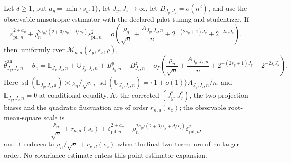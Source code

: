Let \(d\ge1\), put \(a_y=\min\{s_y,1\}\), let \(J_y,J_z\to\infty\), let \(D_{J_y,J_z}=o(n^2)\), and use the observable anisotropic estimator with the declared pilot tuning and studentizer. If
\[
\varepsilon_{\mathrm{pil},n}^{2+a_y}+\rho_n^{2a_y/(2+3/s_y+d/s_z)}\varepsilon_{\mathrm{pil},n}^2
=o\!\left(\frac{\rho_n}{\sqrt n}+\frac{A_{J_y,J_z,n}}n+2^{-(2s_y+1)J_y}+2^{-2s_zJ_z}\right),
\]
then, uniformly over \(\mathcal M_{n,d}(s_y,s_z,\rho)\),
\[
\widehat\theta^{\mathrm{an}}_{J_y,J_z,n}-\theta_n=\mathbb L_{J_y,J_z,n}+\mathbb U_{J_y,J_z,n}+B^y_{J_y,n}+B^z_{J_z,n}+o_P\!\left(\frac{\rho_n}{\sqrt n}+\frac{A_{J_y,J_z,n}}n+2^{-(2s_y+1)J_y}+2^{-2s_zJ_z}\right).
\]
Here \(\operatorname{sd}(\mathbb L_{J_y,J_z,n})\asymp\rho_n/\sqrt n\), \(\operatorname{sd}(\mathbb U_{J_y,J_z,n})=\{1+o(1)\}A_{J_y,J_z,n}/n\), and \(\mathbb L_{J_y,J_z,n}=0\) at conditional equality. At the corrected \((J_y^*,J_z^*)\), the two projection biases and the quadratic fluctuation are of order \(r_{n,d}(s_z)\); the observable root-mean-square scale is
\[
\frac{\rho_n}{\sqrt n}+r_{n,d}(s_z)+\varepsilon_{\mathrm{pil},n}^{2+a_y}+\rho_n^{2a_y/(2+3/s_y+d/s_z)}\varepsilon_{\mathrm{pil},n}^2,
\]
and it reduces to \(\rho_n/\sqrt n+r_{n,d}(s_z)\) when the final two terms are of no larger order. No covariance estimate enters this point-estimator expansion.